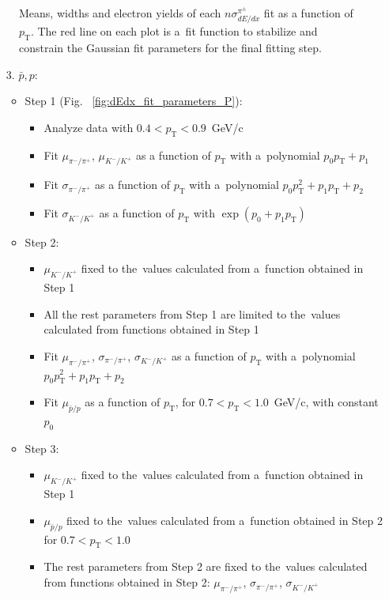 \begin{figure}[h!]
\begin{subfigure}{.32\textwidth}
	\end{subfigure}
	\begin{minipage}{.64\textwidth}
		\caption{Means, widths and electron yields of each $n\sigma^{\pi^\pm}_{dE/dx}$ fit as a function of $p_\textrm{T}$.  The red line on each plot is a~fit function to stabilize and constrain the Gaussian fit parameters for the final fitting step.}
		\label{fig:dEdx_fit_parametersPi}
	\end{minipage}
	
\end{figure}
\begin{enumerate}
	\item[3.] $\bar{p},p$:
	\begin{itemize}
		\item Step 1 (Fig. ~\ref{fig:dEdx_fit_parameters_P}):
		\begin{itemize}
			\renewcommand\labelitemi{--}
			\item Analyze data with $0.4 < p_\textrm{T} < 0.9$~GeV/c
			\item Fit  $\mu_{\pi^-/\pi^+}$, $\mu_{K^-/K^+}$   as a function of $p_\textrm{T}$ with a~polynomial  $p_0p_\textrm{T}+p_1$ 
			\item Fit  $\sigma_{\pi^-/\pi^+}$  as a function of $p_\textrm{T}$ with a~polynomial $p_0p_\textrm{T}^2+p_1p_\textrm{T}+p_2$ 
			\item Fit $\sigma_{K^-/K^+}$ as a function of $p_\textrm{T}$ with $\exp\left(p_0+p_1p_\textrm{T}\right)$
		\end{itemize}
		\item Step 2:
		\begin{itemize}
			\renewcommand\labelitemi{--}
			\item $\mu_{K^-/K^+}$ fixed to the~values calculated from a~function obtained in Step 1
			\item All the rest parameters from Step 1 are limited to the~values calculated from functions obtained in Step 1
			\item Fit  $\mu_{\pi^-/\pi^+}$, $\sigma_{\pi^-/\pi^+}$, $\sigma_{K^-/K^+}$  as a function of $p_\textrm{T}$ with a~polynomial $p_0p_\textrm{T}^2+p_1p_\textrm{T}+p_2$ 
			\item Fit  $\mu_{\bar{p}/p}$  as a function of $p_\textrm{T}$, for $0.7<p_\textrm{T}<1.0$~GeV/c, with constant $p_0$ 
			
		\end{itemize}
		\item Step 3:
		\begin{itemize}
			\renewcommand\labelitemi{--}
			\item  $\mu_{K^-/K^+}$ fixed to the~values calculated from a~function obtained in Step 1
			\item $\mu_{\bar{p}/p}$  fixed to the~values calculated from a~function obtained in Step 2 for $0.7<p_\textrm{T}<1.0$
			\item  The rest parameters from Step 2 are fixed to the~values calculated from functions obtained in Step 2: $\mu_{\pi^-/\pi^+}$, $\sigma_{\pi^-/\pi^+}$, $\sigma_{K^-/K^+}$
		\end{itemize}		
	\end{itemize}		
\end{enumerate} 
